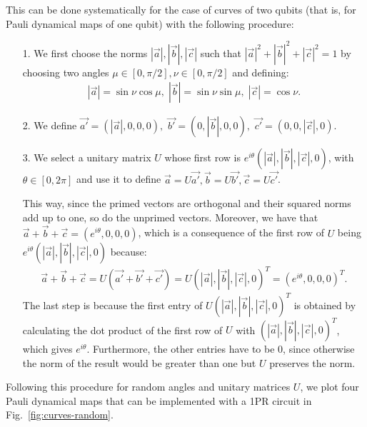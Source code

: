 \documentclass[10pt,letterpaper]{article} %
\newcommand{\fref}[1]{Fig.~\ref{#1}}
\begin{document}
This can be done systematically for the case of curves of two qubits
(that is, for Pauli dynamical maps of one qubit)
with the following procedure:
\begin{itemize}
\item[1.] We first choose the norms $|\vec{a}|, |\vec{b}|, |\vec{c}|$
such that $|\vec{a}|^2 + |\vec{b}|^2 + |\vec{c}|^2 = 1$
by choosing two angles $\mu \in [0, \pi/2] , \nu \in [0,\pi/2]$ and 
defining:
\begin{align*}
|\vec{a}| = \sin \nu \cos \mu, \; |\vec{b}| = \sin \nu \sin \mu , \; |\vec{c}| = \cos \nu.
\end{align*}
\item[2.] We define $\vec{a'} = (|\vec{a}|,0,0,0),$ $\vec{b'} = (0,|\vec{b}|,0,0),$ $\vec{c'} = (0,0,|\vec{c}|,0)$.
\item[3.] We select a unitary matrix $U$
whose first row is $e^{i\theta} (|\vec{a}|, |\vec{b}|, |\vec{c}|,0)$,
with $\theta \in [0,2\pi]$ and use it to define $\vec{a} = U \vec{a'}, \vec{b} = U \vec{b'}, \vec{c} = U \vec{c'}$.

This way, since the primed vectors are orthogonal and their squared norms add up to one,
so do the unprimed vectors. 
Moreover, we have that $\vec{a}+ \vec{b}+ \vec{c} = (e^{i\theta},0,0,0)$,
which is a consequence of the first row of $U$ being $e^{i\theta} (|\vec{a}|, |\vec{b}|, |\vec{c}|,0)$ because:
\begin{align*}
\vec{a} + \vec{b} + \vec{c} = U (\vec{a'} + \vec{b'} + \vec{c'}) = U(|\vec{a}|, |\vec{b}|, |\vec{c}|,0)^T = (e^{i\theta},0,0,0)^T.
\end{align*}
The last step is because the first entry of $U(|\vec{a}|, |\vec{b}|, |\vec{c}|,0)^T$
is obtained by calculating the dot product of the first row of $U$ with $(|\vec{a}|, |\vec{b}|, |\vec{c}|,0)^T$, which gives
$e^{i\theta}$. 
Furthermore, the other entries have to be $0$,
since otherwise the norm of the result would be greater than
one but $U$ preserves the norm.
\end{itemize}

Following this procedure for random
angles and unitary matrices $U$, 
we plot four Pauli dynamical maps 
that can be implemented with a 1PR circuit in \fref{fig:curves-random}.
\end{document}
